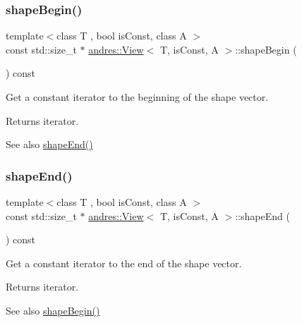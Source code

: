 \subsubsection{\texorpdfstring{shape\+Begin()}{shapeBegin()}}
{\footnotesize\ttfamily template$<$class T , bool is\+Const, class A $>$ \\
const std\+::size\+\_\+t $\ast$ \hyperlink{classandres_1_1View}{andres\+::\+View}$<$ T, is\+Const, A $>$\+::shape\+Begin (\begin{DoxyParamCaption}{ }\end{DoxyParamCaption}) const\hspace{0.3cm}{\ttfamily [inline]}}

Get a constant iterator to the beginning of the shape vector.

\begin{DoxyReturn}{Returns}
iterator. 
\end{DoxyReturn}
\begin{DoxySeeAlso}{See also}
\hyperlink{classandres_1_1View_a351674c9a47edf095f74792dba4860e7}{shape\+End()} 
\end{DoxySeeAlso}
\mbox{\label{classandres_1_1View_a351674c9a47edf095f74792dba4860e7}} 
\subsubsection{\texorpdfstring{shape\+End()}{shapeEnd()}}
{\footnotesize\ttfamily template$<$class T , bool is\+Const, class A $>$ \\
const std\+::size\+\_\+t $\ast$ \hyperlink{classandres_1_1View}{andres\+::\+View}$<$ T, is\+Const, A $>$\+::shape\+End (\begin{DoxyParamCaption}{ }\end{DoxyParamCaption}) const\hspace{0.3cm}{\ttfamily [inline]}}

Get a constant iterator to the end of the shape vector.

\begin{DoxyReturn}{Returns}
iterator. 
\end{DoxyReturn}
\begin{DoxySeeAlso}{See also}
\hyperlink{classandres_1_1View_a72b399659898eaa801789190ff6ea6a8}{shape\+Begin()} 
\end{DoxySeeAlso}
\mbox{\label{classandres_1_1View_a476957393b3b21333bc665e852da47ad}} 

